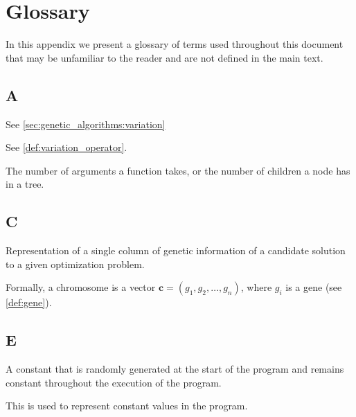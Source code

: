 \chapter{Glossary}
\label{appendix:glossary}
  In this appendix we present a glossary of terms used throughout this document 
  that may be unfamiliar to the reader and are not defined in the main text.

  \section*{A}
    \begin{definition}[Alteration]
    \label{def:alteration}
      See \vref{sec:genetic_algorithms:variation}
    \end{definition}

    \begin{definition}[Alterer]
    \label{def:alterer}
      See \vref{def:variation_operator}.
    \end{definition}

    \begin{definition}[Arity]
    \label{def:arity}
      The number of arguments a function takes, or the number of children a node
      has in a tree.
    \end{definition}

  \section*{C}
    \begin{definition}[Chromosome]
    \label{def:chromosome}
      Representation of a single column of genetic information of a candidate solution to a given
      optimization problem.

      Formally, a chromosome is a vector \(\textbf{c} = (g_1, g_2, \dots, g_n)\), where \(g_i\) is a
      gene (see \vref{def:gene}).
    \end{definition}

  \section*{E}
    \begin{definition}
    \label{def:ephemeral_constant}
      A constant that is randomly generated at the start of the program and 
      remains constant throughout the execution of the program.

      This is used to represent constant values in the program.
    \end{definition}

